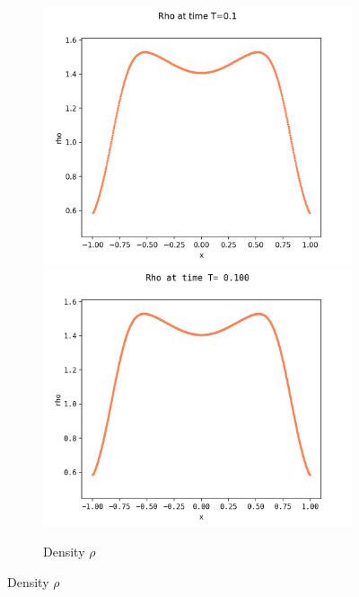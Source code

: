 \documentclass{article}
\numberwithin{equation}{section}
\newcommand{\imh}{\textheight} %
\newcommand{\imw}{\textwidth} %
\begin{document}
\begin{figure}
	\begin{subfigure}{\textwidth}
		\centering
		\includegraphics[height=\imh,width=\imw]{images/rhoT0p1_FD.png}
		\includegraphics[height=\imh,width=\imw]{images/rhoT0p1.png}
		\caption{Density $\rho$}
		\label{subfig:compT01_rho}
	\end{subfigure}
	

\end{figure}
\end{document}
